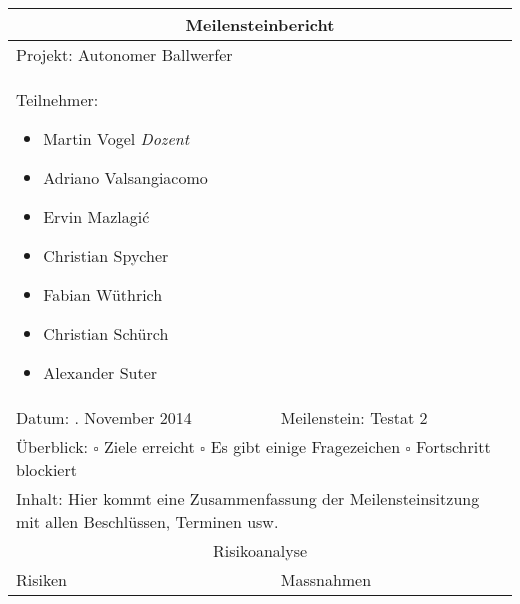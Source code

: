 \begin{table}[!h]
	\renewcommand{\arraystretch}{1.5}
	\begin{tabularx}{\linewidth}{|X|X|}
		\hline
		\multicolumn{2}{|c|}{
			\parbox[0pt][3em][c]{0cm}{}
			{\large \textbf{Meilensteinbericht}}
		} \\
		\hline
		\multicolumn{2}{|l|}{Projekt: Autonomer Ballwerfer} \\
		\hline
		\multicolumn{2}{|p{0.95\textwidth}|}{
			Teilnehmer:
			\begin{itemize}
				\setlength\itemsep{0em}
				\item Martin Vogel \textit{Dozent}
				\item Adriano Valsangiacomo
				\item Ervin Mazlagi\'c
				\item Christian Spycher
				\item Fabian Wüthrich
				\item Christian Schürch
				\item Alexander Suter
			\end{itemize}
		} \\
		\hline
		Datum: . November 2014 & Meilenstein: Testat 2 \\
		\hline
		\multicolumn{2}{|p{0.95\textwidth}|}{
			Überblick: \newline
			$\square$ Ziele erreicht \newline 
			$\square$ Es gibt einige Fragezeichen \newline
			$\square$ Fortschritt blockiert
		} \\
		\hline
		\multicolumn{2}{|p{0.95\textwidth}|}{
			Inhalt: \newline
			Hier kommt eine Zusammenfassung der Meilensteinsitzung mit allen Beschlüssen, Terminen usw.	
		} \\
		\hline
		\multicolumn{2}{|c|}{Risikoanalyse} \\
		\hline
		Risiken & Massnahmen \\
		\hline
	\end{tabularx}
\end{table}
